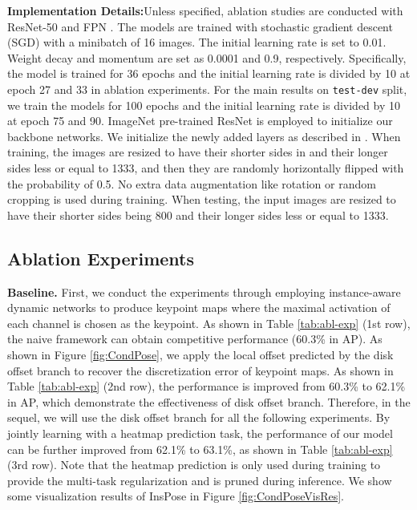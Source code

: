 \documentclass[sigconf]{acmart}
\begin{document}
\textbf{Implementation Details:}\quad Unless specified, ablation studies are conducted with ResNet-50 \cite{he2016deep} and FPN \cite{lin2017feature}. 
The models are trained with stochastic gradient descent (SGD) with a minibatch of 16 images.
The initial learning rate is set to 0.01. Weight decay and momentum are set as 0.0001 and 0.9, respectively. Specifically, the model is trained for 36 epochs and the initial learning
rate is divided by 10 at epoch 27 and 33 in ablation experiments.
For the main results on \texttt{test-dev} split, we train the models for 100 epochs and the initial learning rate is divided by 10 at epoch 75 and 90.
ImageNet \cite{deng2009imagenet} pre-trained ResNet \cite{he2016deep} is employed to initialize our backbone networks. We initialize the newly added layers as described in \cite{lin2017focal}. When training, the images are resized to have their shorter sides in  and their longer sides less or equal to 1333, and then they are randomly horizontally flipped with the probability of 0.5. No extra data augmentation like rotation \cite{nie2019single} or random cropping \cite{tian2019directpose} is used during training. When testing, the input images are resized to have their shorter sides being 800 and their longer sides less or equal to 1333.


\subsection{Ablation Experiments}

\textbf{Baseline.}\quad
First, we conduct the experiments through employing instance-aware dynamic networks to produce keypoint maps where the maximal activation of each channel is chosen as the keypoint. As shown in Table \ref{tab:abl-exp} (1st row), the naive framework can obtain competitive performance (60.3\% in AP).
As shown in Figure \ref{fig:CondPose}, we apply the local offset predicted by the disk offset branch to recover the discretization error of keypoint maps. As shown in Table \ref{tab:abl-exp} (2nd row), the performance is improved from 60.3\% to 62.1\% in AP, which demonstrate the effectiveness of disk offset branch. Therefore, in the sequel, we will use the disk offset branch for all the following experiments.
By jointly learning with a heatmap prediction task, the performance of our model can be further improved from 62.1\% to 63.1\%, as shown in Table \ref{tab:abl-exp} (3rd row). Note that the heatmap prediction is only used during training to provide the multi-task regularization and is pruned during inference. We show some visualization results of InsPose in Figure \ref{fig:CondPoseVisRes}.
\end{document}
